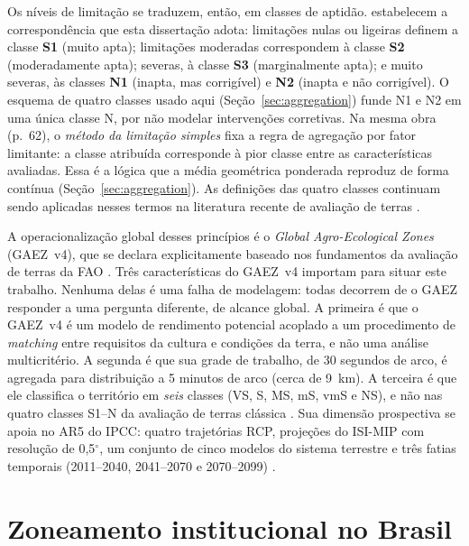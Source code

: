 Os níveis de limitação se traduzem, então, em classes de aptidão. \citet[p.~62]{sys_land_1991}
estabelecem a correspondência que esta dissertação adota: limitações nulas ou ligeiras definem a
classe \textbf{S1} (muito apta); limitações moderadas correspondem à classe \textbf{S2} (moderadamente
apta); severas, à classe \textbf{S3} (marginalmente apta); e muito severas, às classes \textbf{N1}
(inapta, mas corrigível) e \textbf{N2} (inapta e não corrigível). O esquema de quatro classes usado
aqui (Seção~\ref{sec:aggregation}) funde N1 e N2 em uma única classe N, por não modelar intervenções
corretivas. Na mesma obra (p.~62), o \emph{método da limitação simples} fixa a regra de agregação por
fator limitante: a classe atribuída corresponde à pior classe entre as características avaliadas. Essa
é a lógica que a média geométrica ponderada reproduz de forma contínua (Seção~\ref{sec:aggregation}).
As definições das quatro classes continuam sendo aplicadas nesses termos na literatura recente de
avaliação de terras \citep[Tabela~1, p.~5]{haile_assessment_2026}.

A operacionalização global desses princípios é o \emph{Global Agro-Ecological Zones} (GAEZ~v4), que se
declara explicitamente baseado nos fundamentos da avaliação de terras da FAO
\citep[p.~1]{fischer_global_2021}. Três características do GAEZ~v4 importam para situar este trabalho.
Nenhuma delas é uma falha de modelagem: todas decorrem de o GAEZ responder a uma pergunta diferente, de
alcance global. A primeira é que o GAEZ~v4 é um modelo de rendimento potencial acoplado a um procedimento
de \emph{matching} entre requisitos da cultura e condições da terra, e não uma análise multicritério. A
segunda é que sua grade de trabalho, de 30 segundos de arco, é agregada para distribuição a 5 minutos de
arco (cerca de 9~km). A terceira é que ele classifica o território em \emph{seis} classes (VS, S, MS,
mS, vmS e NS), e não nas quatro classes S1--N da avaliação de terras clássica
\citep[p.~8]{fischer_global_2021}. Sua dimensão prospectiva se apoia no AR5 do IPCC: quatro
trajetórias RCP, projeções do ISI-MIP com resolução de 0,5$^\circ$, um conjunto de cinco modelos do
sistema terrestre e três fatias temporais (2011--2040, 2041--2070 e 2070--2099)
\citep[p.~15]{fischer_global_2021}.

\section{Zoneamento institucional no Brasil}\label{sec:sota-brasil}


